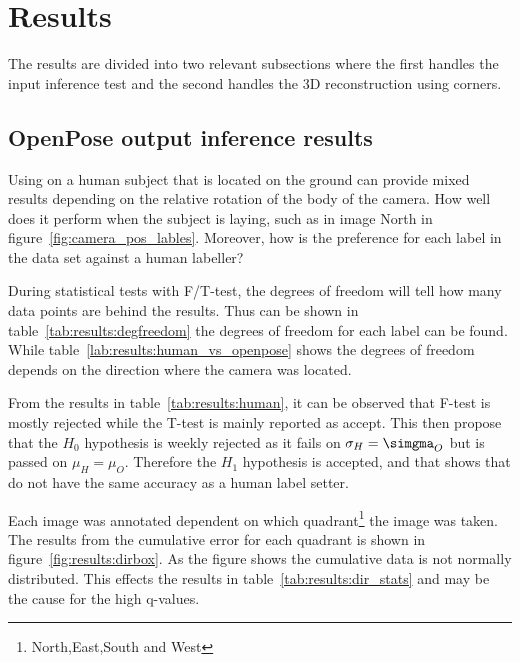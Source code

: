 \section{Results}\label{sec:results}


The results are divided into two relevant subsections where the first handles the input inference test and the second handles the 3D reconstruction using \aruco corners.
\subsection{OpenPose output inference results}%
\label{sub:res:op_inference}
Using \openpose{ } on a human subject that is located on the ground can provide mixed results depending on the relative rotation of the body of the camera.
How well does it perform when the subject is laying, such as in image North in figure~\ref{fig:camera_pos_lables}.
Moreover, how is the preference for each label in the \operpose data set against a human labeller?

During statistical tests with F/T-test, the degrees of freedom will tell how many data points are behind the results.
Thus can be shown in table~\ref{tab:results:degfreedom} the degrees of freedom for each label can be found.
While table~\ref{lab:results:human_vs_openpose} shows the degrees of freedom depends on the direction where the camera was located.

From the results in table~\ref{tab:results:human}, it can be observed that F-test is mostly rejected while the T-test is mainly reported as accept.
This then propose that the $H_0$ hypothesis is weekly rejected as it fails on $\sigma_H = \simgma_O$ but is passed on $\mu_H = \mu_O$.
Therefore the $H_1$ hypothesis is accepted, and that shows that \openpose{ } do not have the same accuracy as a human label setter.

Each image was annotated dependent on which quadrant\footnote{North,East,South and West} the image was taken.
The results from the cumulative error for each quadrant is shown in figure~\ref{fig:results:dirbox}.
As the figure shows the cumulative data is not normally distributed.
This effects the results in table~\ref{tab:results:dir_stats} and may be the cause for the high q-values.


